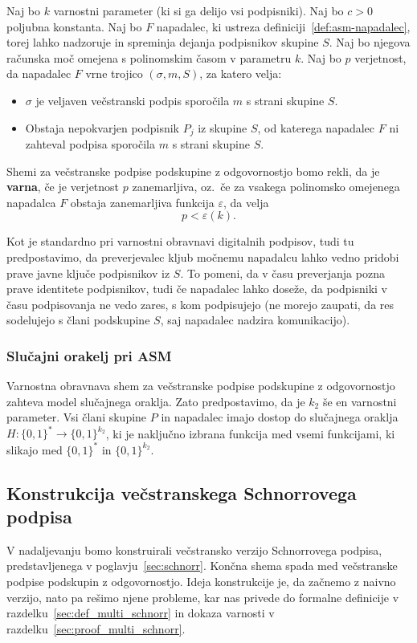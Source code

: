 \begin{definicija}
\label{def:asm-varnost}
    Naj bo $k$ varnostni parameter (ki si ga delijo vsi podpisniki). Naj bo $c > 0$ poljubna konstanta. 
    Naj bo $F$ napadalec, ki ustreza definiciji~\ref{def:asm-napadalec}, torej lahko nadzoruje in
    spreminja dejanja podpisnikov skupine $S$. Naj bo njegova računska moč omejena s polinomskim časom
    v parametru $k$. Naj bo $p$ verjetnost, da napadalec $F$ vrne trojico $(\sigma, m, S)$, za katero velja: 
    \begin{itemize}
        \item $\sigma$ je veljaven večstranski podpis sporočila $m$ s strani skupine $S$.
        \item Obstaja nepokvarjen podpisnik $P_j$ iz skupine $S$, od katerega napadalec $F$ ni zahteval podpisa 
            sporočila $m$ s strani skupine $S$.
    \end{itemize}
    Shemi za večstranske 
    podpise podskupine z odgovornostjo bomo rekli, da je \textbf{varna}, če je verjetnost $p$ zanemarljiva,
    oz.\ če za vsakega polinomsko omejenega napadalca $F$ obstaja zanemarljiva funkcija $\varepsilon$,
    da velja
    $$ 
    p < \varepsilon(k).
    $$
\end{definicija}

Kot je standardno pri varnostni obravnavi digitalnih podpisov, tudi tu predpostavimo, da preverjevalec
kljub močnemu napadalcu lahko vedno pridobi prave javne ključe podpisnikov iz $S$. To pomeni, da
v času preverjanja pozna prave identitete podpisnikov, tudi če napadalec lahko doseže, da podpisniki
v času podpisovanja ne vedo zares, s kom podpisujejo (ne morejo zaupati, da res sodelujejo s člani
podskupine $S$, saj napadalec nadzira komunikacijo).

\subsubsection{Slučajni orakelj pri ASM}
Varnostna obravnava shem za večstranske podpise podskupine z odgovornostjo zahteva model slučajnega
oraklja. Zato predpostavimo, da je $k_2$ še en varnostni parameter. Vsi člani skupine $P$ in
napadalec imajo dostop do slučajnega oraklja $H: \{0, 1\}^* \rightarrow \{0, 1\}^{k_2}$, ki je
naključno izbrana funkcija med vsemi funkcijami, ki slikajo med $\{0, 1\}^*$ in $\{0, 1\}^{k_2}$.

\subsection{Konstrukcija večstranskega Schnorrovega podpisa}
V nadaljevanju bomo konstruirali večstransko verzijo Schnorrovega podpisa, predstavljenega v
poglavju~\ref{sec:schnorr}. Končna shema spada med večstranske podpise podskupin z odgovornostjo.
Ideja konstrukcije je, da začnemo z naivno verzijo, nato pa rešimo njene probleme, kar nas
privede do formalne definicije v razdelku~\ref{sec:def_multi_schnorr} in dokaza varnosti v
razdelku~\ref{sec:proof_multi_schnorr}.

